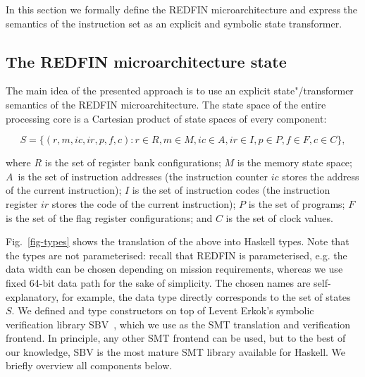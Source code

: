 
In this section we formally define the REDFIN microarchitecture and express the
semantics of the instruction set as an explicit and symbolic state transformer.


\subsection{The REDFIN microarchitecture state}


The main idea of the presented approach is to use an explicit state"/transformer
semantics of the REDFIN microarchitecture. The state space of the entire
processing core is a Cartesian product of state spaces of every component:


\[
S=\{(r, m, ic, ir, p, f, c) : r \in R, m \in M, ic \in A, ir \in I, p \in P, f \in F, c \in C\},
\]

\noindent
where $R$ is the set of register bank configurations;
$M$ is the memory state space;
$A$~is the set of instruction addresses (the instruction counter $ic$ stores the
address of the current instruction);
$I$ is the set of instruction codes (the instruction register $ir$ stores the
code of the current instruction);
$P$ is the set of programs;
$F$ is the set of the flag register configurations; and
$C$ is the set of clock values.

Fig.~\ref{fig-types} shows the translation of the above into Haskell types. Note
that the types are not parameterised: recall that REDFIN is parameterised, e.g.
the data width can be chosen depending on mission requirements, whereas we use fixed
64-bit data path for the sake of simplicity. The chosen names are self-explanatory,
for example, the data type  directly corresponds to the set of states~$S$.
We defined  and  type constructors on top of
Levent Erkok's symbolic verification library SBV~\cite{SBV}, which we use as the
SMT translation and verification frontend. In principle, any other SMT frontend
can be used, but to the best of our knowledge, SBV is the most mature SMT library
available for Haskell. We briefly overview all  components below.

